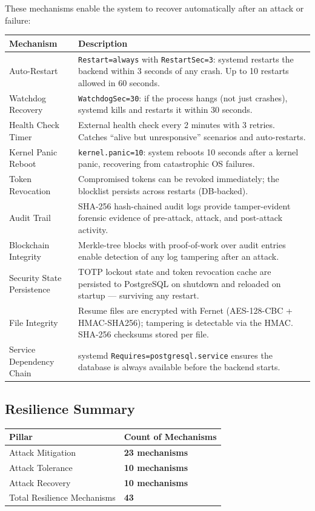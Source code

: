 \documentclass[12pt,a4paper]{article}
\begin{document}
These mechanisms enable the system to recover automatically after an attack or failure:

\begin{center}
\small
\begin{tabularx}{\textwidth}{lX}
\toprule
\textbf{Mechanism} & \textbf{Description} \\
\midrule
Auto-Restart & \texttt{Restart=always} with \texttt{RestartSec=3}: systemd restarts the backend within 3 seconds of any crash. Up to 10 restarts allowed in 60 seconds. \\
Watchdog Recovery & \texttt{WatchdogSec=30}: if the process hangs (not just crashes), systemd kills and restarts it within 30 seconds. \\
Health Check Timer & External health check every 2 minutes with 3 retries. Catches ``alive but unresponsive'' scenarios and auto-restarts. \\
Kernel Panic Reboot & \texttt{kernel.panic=10}: system reboots 10 seconds after a kernel panic, recovering from catastrophic OS failures. \\
Token Revocation & Compromised tokens can be revoked immediately; the blocklist persists across restarts (DB-backed). \\
Audit Trail & SHA-256 hash-chained audit logs provide tamper-evident forensic evidence of pre-attack, attack, and post-attack activity. \\
Blockchain Integrity & Merkle-tree blocks with proof-of-work over audit entries enable detection of any log tampering after an attack. \\
Security State Persistence & TOTP lockout state and token revocation cache are persisted to PostgreSQL on shutdown and reloaded on startup — surviving any restart. \\
File Integrity & Resume files are encrypted with Fernet (AES-128-CBC + HMAC-SHA256); tampering is detectable via the HMAC. SHA-256 checksums stored per file. \\
Service Dependency Chain & systemd \texttt{Requires=postgresql.service} ensures the database is always available before the backend starts. \\
\bottomrule
\end{tabularx}
\end{center}

\subsection{Resilience Summary}

\begin{center}
\begin{tabular}{ll}
\toprule
\textbf{Pillar} & \textbf{Count of Mechanisms} \\
\midrule
Attack Mitigation & \textbf{23 mechanisms} \\
Attack Tolerance & \textbf{10 mechanisms} \\
Attack Recovery & \textbf{10 mechanisms} \\
\midrule
Total Resilience Mechanisms & \textbf{43} \\
\bottomrule
\end{tabular}
\end{center}
\end{document}
